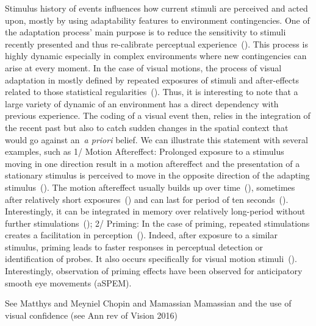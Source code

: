 \documentclass[profile,final,english, draft]{article}%
\newcommand{\citep}[1]{(\cite{#1})}
\begin{document}
 
Stimulus history of events influences how current stimuli are perceived and acted upon, mostly by using adaptability features to environment contingencies. One of the adaptation process' main purpose is to reduce the sensitivity to stimuli recently presented and thus re-calibrate perceptual experience~\citep{Clifford2007, Webster2011, Kohn2007}. This process is highly dynamic especially in complex environments where new contingencies can arise at every moment. In the case of visual motions, the process of visual adaptation in mostly defined by repeated exposures of stimuli and after-effects related to those statistical regularities~\citep{Thompson2009}. Thus, it is interesting to note that a large variety of dynamic of an environment has a direct dependency with previous experience. The coding of a visual event then, relies in the integration of the recent past but also to catch sudden changes in the spatial context that would go against an~\textit{a priori} belief. We can illustrate this statement with several examples, such as 1/ Motion Aftereffect: Prolonged exposure to a stimulus moving in one direction result in a motion aftereffect and the presentation of a stationary stimulus is perceived to move in the opposite direction of the adapting stimulus~\citep{Anstis1998, Mather2011}. The motion aftereffect usually builds up over time~\citep{Hershenson1993}, sometimes after relatively short exposures~\citep{Kanai2005, Pavan2010} and can last for period of ten seconds~\citep{Anstis1998}. Interestingly, it can be integrated in memory over relatively long-period without further stimulations~\citep{Verstraten1994, Wiesenfelder1992}; 2/ Priming: In the case of priming, repeated stimulations creates a facilitation in perception~\citep{Kristjnsson2010WherePM, Maljkovic1994, Tulving1990}. Indeed, after exposure to a similar stimulus, priming leads to faster responses in perceptual detection or identification of probes. It also occurs specifically for visual motion stimuli~\citep{Anstis1987, Campana2002, Pinkus1997}. Interestingly, observation of priming effects have been observed for anticipatory smooth eye movements (aSPEM). 

See Matthys and Meyniel
Chopin and Mamassian
Mamassian and the use of visual confidence  (see Ann rev of Vision 2016)
\end{document}
